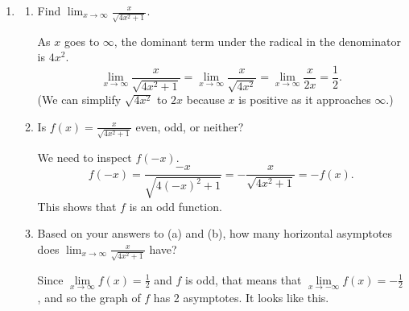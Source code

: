 \documentclass{article}
\begin{document}
\begin{enumerate}
\begin{enumerate}
  \end{enumerate}

\item 
  \begin{enumerate}
  \item
    \begin{problem}[\vfill]
      Find $\displaystyle \lim_{x \to \infty} \frac{x}{\sqrt{4x^2 + 1}}$.
    \end{problem}

    \begin{solution}
      As $x$ goes to $\infty$, the dominant term under the radical in the denominator is $4x^2$.
      \[
        \lim_{x \to \infty} \frac{x}{\sqrt{4x^2+1}} = \lim_{x \to \infty} \frac{x}{\sqrt{4x^2}} 
        = \lim_{x \to \infty} \frac{x}{2x} 
        = \frac{1}{2}.
      \]
      (We can simplify $\sqrt{4x^2}$ to $2x$ because $x$ is positive as it approaches $\infty$.)
    \end{solution}

  \item
    \begin{problem}[\vfill]
      Is $\displaystyle f(x) = \frac{x}{\sqrt{4x^2 + 1}}$ even, odd, or neither? 
    \end{problem}

    \begin{solution}
      We need to inspect $f(-x)$. 
      \[f(-x) = \frac{-x}{\sqrt{4(-x)^2+1}} = -\frac{x}{\sqrt{4x^2+1}} = -f(x).\]
      This shows that $f$ is an odd function.
    \end{solution}

  \item
    \begin{problem}[\vfill]
      Based on your answers to (a) and (b), how many horizontal asymptotes does $\displaystyle \lim_{x \to \infty} \frac{x}{\sqrt{4x^2 + 1}}$ have? 
    \end{problem}

    \begin{solution}
      Since $\lim\limits_{x \to \infty} f(x) = \frac{1}{2}$ and $f$ is odd, that means that
      $\lim\limits_{x \to -\infty} f(x) = -\frac{1}{2}$, and so the graph of $f$ has 2 asymptotes. It looks
      like this.

    \end{solution}


\end{enumerate}
\end{enumerate}
\end{document}
